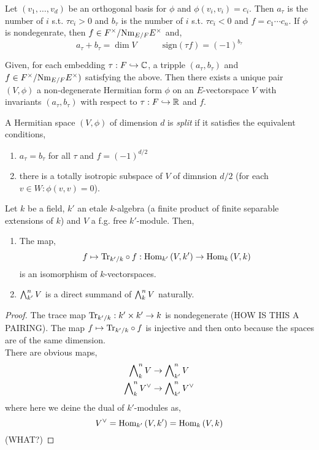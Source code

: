 \documentclass[12pt]{article}
\begin{document}
\begin{remark}
Let $(v_1, \dots, v_d)$ be an orthogonal basis for $\phi$ and $\phi(v_i, v_i) = c_i$. Then $a_\tau$ is the number of $i$ s.t. $\tau c_i > 0$ and $b_\tau$ is the number of $i$ s.t. $\tau c_i < 0$ and $f = c_1 \cdots c_n$. If $\phi$ is nondegenrate, then $f \in F^\times / \mathrm{Nm}_{E/F} E^\times$ and,
\[ a_\tau + b_\tau = \dim{V} \quad \quad \quad \mathrm{sign}{(\tau f)} = (-1)^{b_\tau} \]
\end{remark}

\begin{proposition}
Given, for each embedding  $\tau : F \hookrightarrow \mathbb{C}$, a tripple $(a_\tau, b_\tau)$ and $f \in F^\times / \mathrm{Nm}_{E/F} E^\times)$ satisfying the above. Then there exists a unique pair $(V, \phi)$ a non-degenerate Hermitian form $\phi$ on an $E$-vectorspace $V$ with invariants $(a_\tau, b_\tau)$ with respect to $\tau : F \hookrightarrow \mathbb{R}$ and $f$. 
\end{proposition}

\begin{definition}
A Hermitian space $(V, \phi)$ of dimension $d$ is \textit{split} if it satisfies the equivalent conditions,
\begin{enumerate}
\item $a_\tau = b_\tau$ for all $\tau$ and $f = (-1)^{d/2}$
\item there is a totally isotropic subspace of $V$ of dimnsion $d/2$ (for each $v \in W : \phi(v,v) = 0$).
\end{enumerate}
\end{definition}

\begin{lemma}
Let $k$ be a field, $k'$ an etale $k$-algebra (a finite product of finite separable extensions of $k$) and $V$ a f.g. free $k'$-module. Then,
\begin{enumerate}
\item The map,
\[ f \mapsto \mathrm{Tr}_{k'/k} \circ f : \mathrm{Hom}_{k'} \left( V, k' \right) \to \mathrm{Hom}_{k} \left( V, k \right) \]
is an isomorphism of $k$-vectorspaces.
\item $\bigwedge\nolimits^n_{k'} V$ is a direct summand of $\bigwedge\nolimits^n_k V$ naturally.
\end{enumerate}
\end{lemma}

\begin{proof}
The trace map $\mathrm{Tr}_{k'/k} : k' \times k' \to k$ is nondegenerate (HOW IS THIS A PAIRING). The map $f \mapsto \mathrm{Tr}_{k'/k} \circ f$ is injective and then onto because the spaces are of the same dimension.
\bigskip\\
There are obvious maps,
\begin{align*}
\bigwedge\nolimits^n_k V & \to \bigwedge\nolimits^n_{k'} V 
\\
\bigwedge\nolimits^n_k V^\vee & \to \bigwedge\nolimits^n_{k'} V^\vee
\end{align*}
where here we deine the dual of $k'$-modules as,
\[ V^\vee = \mathrm{Hom}_{k'} \left( V, k' \right) = \mathrm{Hom}_{k} \left( V, k \right) \]
(WHAT?)
\end{proof}
\end{document}
